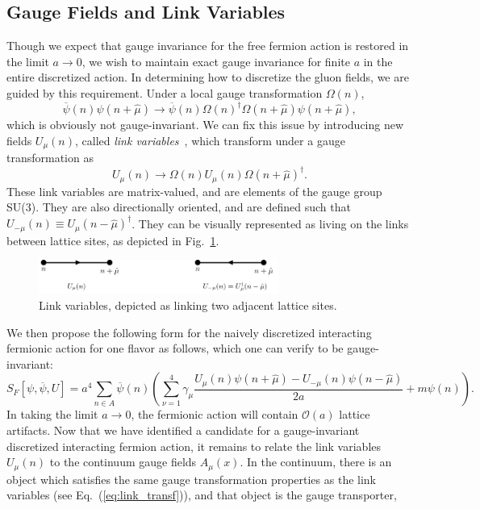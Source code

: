 \subsection{Gauge Fields and Link Variables}
Though we expect that gauge invariance for the free fermion action is restored in the limit $a \rightarrow 0$, we wish to maintain exact gauge invariance for finite $a$ in the entire discretized action. In determining how to discretize the gluon fields, we are guided by this requirement. Under a local gauge transformation $\Omega(n)$,
\begin{equation}
    \overline{\psi}(n) \psi(n+\hat{\mu}) \rightarrow \overline{\psi}(n) \Omega(n)^{\dagger} \Omega(n+\hat{\mu}) \psi(n+\hat{\mu}),
\end{equation}
which is obviously not gauge-invariant. We can fix this issue by introducing new fields $U_\mu(n)$, called \emph{link variables}~\cite{Wilson:1974sk}, which transform under a gauge transformation as
\begin{equation}\label{eq:link_transf}
    U_{\mu}(n) \rightarrow \Omega(n) U_{\mu}(n) \Omega(n+\hat{\mu})^{\dagger}.
\end{equation}
These link variables are matrix-valued, and are elements of the gauge group SU(3). They are also directionally oriented, and are defined such that $U_{-\mu}(n) \equiv U_{\mu}(n-\hat{\mu})^{\dagger}$. They can be visually represented as living on the links between lattice sites, as depicted in Fig.~\ref{fig:links}.
\begin{figure}
    \centering
    \includegraphics[width=0.7\textwidth]{figures/links.pdf}
    \caption{Link variables, depicted as linking two adjacent lattice sites.}
    \label{fig:links}
\end{figure}
We then propose the following form for the naively discretized interacting fermionic action for one flavor as follows, which one can verify to be gauge-invariant:
\begin{equation}\label{eq:lattice_fermion_action}
    S_{F}[\psi, \overline{\psi}, U]=a^{4} \sum_{n \in A} \overline{\psi}(n)\left(\sum_{\nu=1}^{4} \gamma_{\mu} \frac{U_{\mu}(n) \psi(n+\hat{\mu})-U_{-\mu}(n) \psi(n-\hat{\mu})}{2 a}+m \psi(n)\right).
\end{equation}
In taking the limit $a\rightarrow 0$, the fermionic action will contain $\mathcal O(a)$ lattice artifacts. Now that we have identified a candidate for a gauge-invariant discretized interacting fermion action, it remains to relate the link variables $U_\mu(n)$ to the continuum gauge fields $A_\mu(x)$. In the continuum, there is an object which satisfies the same gauge transformation properties as the link variables (see Eq.~(\ref{eq:link_transf})), and that object is the gauge transporter,

